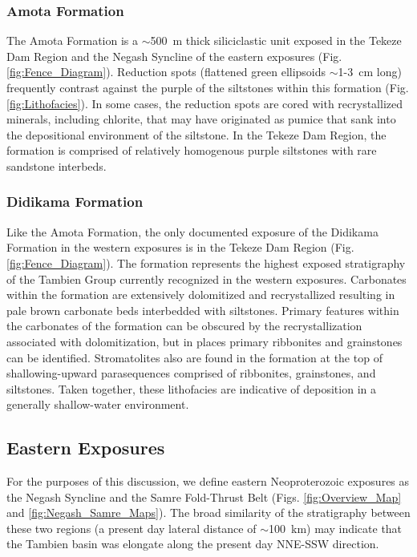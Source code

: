 \documentclass[11pt,letterpaper]{article}
\begin{document}
\subsubsection*{Amota Formation}

The Amota Formation is a $\sim$500~m thick siliciclastic unit exposed in the Tekeze Dam Region and the Negash Syncline of the eastern exposures (Fig. \ref{fig:Fence_Diagram}). Reduction spots (flattened green ellipsoids $\sim$1-3~cm long) frequently contrast against the purple of the siltstones within this formation (Fig. \ref{fig:Lithofacies}). In some cases, the reduction spots are cored with recrystallized minerals, including chlorite, that may have originated as pumice that sank into the depositional environment of the siltstone. In the Tekeze Dam Region, the formation is comprised of relatively homogenous purple siltstones with rare sandstone interbeds.

\subsubsection*{Didikama Formation}

Like the Amota Formation, the only documented exposure of the Didikama Formation in the western exposures is in the Tekeze Dam Region (Fig. \ref{fig:Fence_Diagram}). The formation represents the highest exposed stratigraphy of the Tambien Group currently recognized in the western exposures. Carbonates within the formation are extensively dolomitized and recrystallized resulting in pale brown carbonate beds interbedded with siltstones. Primary features within the carbonates of the formation can be obscured by the recrystallization associated with dolomitization, but in places primary ribbonites and grainstones can be identified. Stromatolites also are found in the formation at the top of shallowing-upward parasequences comprised of ribbonites, grainstones, and siltstones. Taken together, these lithofacies are indicative of deposition in a generally shallow-water environment.

\subsection*{Eastern Exposures \label{sec:EasternExposures}}

For the purposes of this discussion, we define eastern Neoproterozoic exposures as the Negash Syncline and the Samre Fold-Thrust Belt (Figs. \ref{fig:Overview_Map} and \ref{fig:Negash_Samre_Maps}). The broad similarity of the stratigraphy between these two regions (a present day lateral distance of $\sim$100~km) may indicate that the Tambien basin was elongate along the present day NNE-SSW direction.
\end{document}

